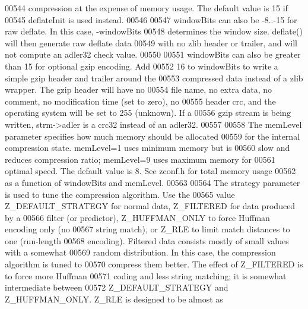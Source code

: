 \begin{DoxyCode}
00544 \textcolor{comment}{   compression at the expense of memory usage.  The default value is 15 if}
00545 \textcolor{comment}{   deflateInit is used instead.}
00546 \textcolor{comment}{}
00547 \textcolor{comment}{     windowBits can also be -8..-15 for raw deflate.  In this case, -windowBits}
00548 \textcolor{comment}{   determines the window size.  deflate() will then generate raw deflate data}
00549 \textcolor{comment}{   with no zlib header or trailer, and will not compute an adler32 check value.}
00550 \textcolor{comment}{}
00551 \textcolor{comment}{     windowBits can also be greater than 15 for optional gzip encoding.  Add}
00552 \textcolor{comment}{   16 to windowBits to write a simple gzip header and trailer around the}
00553 \textcolor{comment}{   compressed data instead of a zlib wrapper.  The gzip header will have no}
00554 \textcolor{comment}{   file name, no extra data, no comment, no modification time (set to zero), no}
00555 \textcolor{comment}{   header crc, and the operating system will be set to 255 (unknown).  If a}
00556 \textcolor{comment}{   gzip stream is being written, strm->adler is a crc32 instead of an adler32.}
00557 \textcolor{comment}{}
00558 \textcolor{comment}{     The memLevel parameter specifies how much memory should be allocated}
00559 \textcolor{comment}{   for the internal compression state.  memLevel=1 uses minimum memory but is}
00560 \textcolor{comment}{   slow and reduces compression ratio; memLevel=9 uses maximum memory for}
00561 \textcolor{comment}{   optimal speed.  The default value is 8.  See zconf.h for total memory usage}
00562 \textcolor{comment}{   as a function of windowBits and memLevel.}
00563 \textcolor{comment}{}
00564 \textcolor{comment}{     The strategy parameter is used to tune the compression algorithm.  Use the}
00565 \textcolor{comment}{   value Z\_DEFAULT\_STRATEGY for normal data, Z\_FILTERED for data produced by a}
00566 \textcolor{comment}{   filter (or predictor), Z\_HUFFMAN\_ONLY to force Huffman encoding only (no}
00567 \textcolor{comment}{   string match), or Z\_RLE to limit match distances to one (run-length}
00568 \textcolor{comment}{   encoding).  Filtered data consists mostly of small values with a somewhat}
00569 \textcolor{comment}{   random distribution.  In this case, the compression algorithm is tuned to}
00570 \textcolor{comment}{   compress them better.  The effect of Z\_FILTERED is to force more Huffman}
00571 \textcolor{comment}{   coding and less string matching; it is somewhat intermediate between}
00572 \textcolor{comment}{   Z\_DEFAULT\_STRATEGY and Z\_HUFFMAN\_ONLY.  Z\_RLE is designed to be almost as}

\end{DoxyCode}

